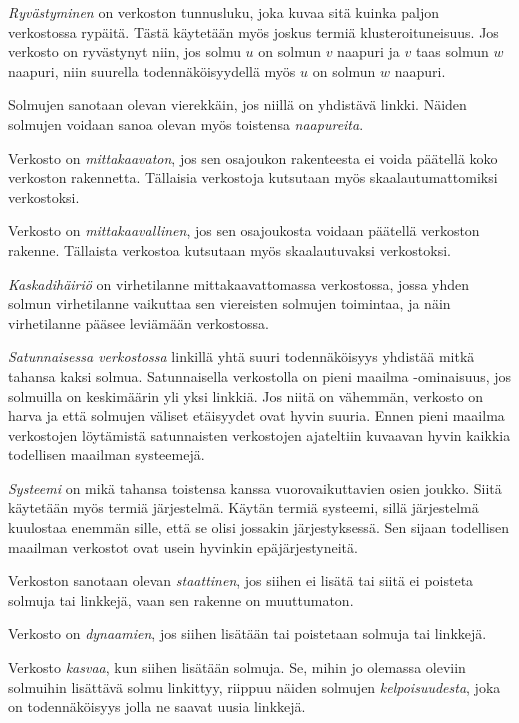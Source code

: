 \documentclass[finnish,12pt,a4paper,pdftex,elec,utf8]{aaltothesis}
\begin{document}
\emph{Ryvästyminen} on verkoston tunnusluku, joka kuvaa sitä kuinka paljon verkostossa rypäitä. Tästä käytetään myös joskus termiä klusteroituneisuus. Jos verkosto on ryvästynyt niin, jos solmu $u$ on solmun $v$ naapuri ja $v$ taas solmun $w$ naapuri, niin suurella todennäköisyydellä myös $u$ on solmun $w$ naapuri.

Solmujen sanotaan olevan vierekkäin, jos niillä on yhdistävä linkki. Näiden solmujen voidaan sanoa olevan myös toistensa \emph{naapureita}.

Verkosto on \emph{mittakaavaton}, jos sen osajoukon rakenteesta ei voida päätellä koko verkoston rakennetta. Tällaisia verkostoja kutsutaan myös skaalautumattomiksi verkostoksi.

Verkosto on \emph{mittakaavallinen}, jos sen osajoukosta voidaan päätellä verkoston rakenne. Tällaista verkostoa kutsutaan myös skaalautuvaksi verkostoksi.

\emph{Kaskadihäiriö} on virhetilanne mittakaavattomassa verkostossa, jossa yhden solmun virhetilanne vaikuttaa sen viereisten solmujen toimintaa, ja näin virhetilanne pääsee leviämään verkostossa.

\emph{Satunnaisessa verkostossa} linkillä yhtä suuri todennäköisyys yhdistää mitkä tahansa kaksi solmua. Satunnaisella verkostolla on pieni maailma -ominaisuus, jos solmuilla on keskimäärin yli yksi linkkiä. Jos niitä on vähemmän, verkosto on harva ja että solmujen väliset etäisyydet ovat hyvin suuria. Ennen pieni maailma verkostojen löytämistä satunnaisten verkostojen ajateltiin kuvaavan hyvin kaikkia todellisen maailman systeemejä. \cite[56]{Linkit} 

\emph{Systeemi} on mikä tahansa toistensa kanssa vuorovaikuttavien osien joukko. Siitä käytetään myös termiä järjestelmä. Käytän termiä systeemi, sillä järjestelmä kuulostaa enemmän sille, että se olisi jossakin järjestyksessä. Sen sijaan todellisen maailman verkostot ovat usein hyvinkin epäjärjestyneitä.


Verkoston sanotaan olevan \emph{staattinen}, jos siihen ei lisätä tai siitä ei poisteta solmuja tai linkkejä, vaan sen rakenne on muuttumaton.

Verkosto on \emph{dynaamien}, jos siihen lisätään tai poistetaan solmuja tai linkkejä.

Verkosto \emph{kasvaa}, kun siihen lisätään solmuja. Se, mihin jo olemassa oleviin solmuihin lisättävä solmu linkittyy, riippuu näiden solmujen \emph{kelpoisuudesta}, joka
on todennäköisyys jolla ne saavat uusia linkkejä.
\end{document}
